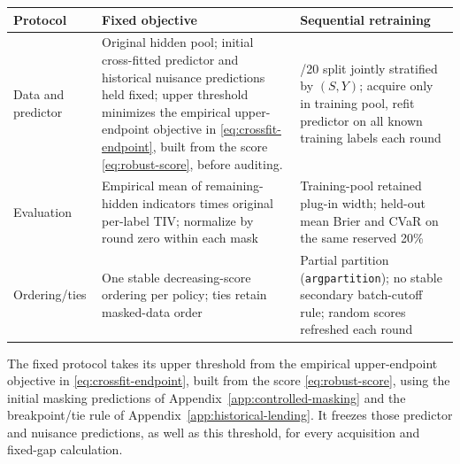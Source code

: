 \begin{center}
\small\setlength{\tabcolsep}{3pt}
\begin{tabularx}{\textwidth}{@{}>{\raggedright\arraybackslash}p{}>{\raggedright\arraybackslash}X>{\raggedright\arraybackslash}X@{}}
\toprule
Protocol & Fixed objective & Sequential retraining\\
\midrule
Data and predictor & Original hidden pool; initial cross-fitted predictor and historical nuisance predictions held fixed; upper threshold minimizes the empirical upper-endpoint objective in \eqref{eq:crossfit-endpoint}, built from the score \eqref{eq:robust-score}, before auditing. & 80/20 split jointly stratified by $(S,Y)$; acquire only in training pool, refit predictor on all known training labels each round\\
Evaluation & Empirical mean of remaining-hidden indicators times original per-label TIV; normalize by round zero within each mask & Training-pool retained plug-in width; held-out mean Brier and CVaR on the same reserved 20\%\\
Ordering/ties & One stable decreasing-score ordering per policy; ties retain masked-data order & Partial partition (\texttt{argpartition}); no stable secondary batch-cutoff rule; random scores refreshed each round\\
\bottomrule
\end{tabularx}
\end{center}

\begin{samepage}
The fixed protocol takes its upper threshold from the empirical upper-endpoint objective in
\eqref{eq:crossfit-endpoint}, built from the score \eqref{eq:robust-score}, using the
initial masking predictions of Appendix~\ref{app:controlled-masking} and the breakpoint/tie
rule of Appendix~\ref{app:historical-lending}. It freezes those predictor and nuisance
predictions, as well as this threshold, for every acquisition and fixed-gap calculation.
\par\end{samepage}

